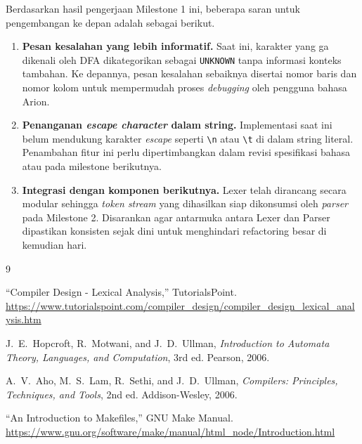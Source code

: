 \documentclass[11pt,a4paper]{article}
\begin{document}
Berdasarkan hasil pengerjaan Milestone 1 ini, beberapa saran untuk pengembangan ke depan adalah sebagai berikut.

\begin{enumerate}
    \item \textbf{Pesan kesalahan yang lebih informatif.}
          Saat ini, karakter yang ga dikenali oleh DFA dikategorikan sebagai \texttt{UNKNOWN} tanpa informasi konteks tambahan.
          Ke depannya, pesan kesalahan sebaiknya disertai nomor baris dan nomor kolom untuk mempermudah proses \textit{debugging} oleh pengguna bahasa Arion.
    \item \textbf{Penanganan \textit{escape character} dalam string.}
          Implementasi saat ini belum mendukung karakter \textit{escape} seperti \texttt{\textbackslash n} atau \texttt{\textbackslash t} di dalam string literal.
          Penambahan fitur ini perlu dipertimbangkan dalam revisi spesifikasi bahasa atau pada milestone berikutnya.
    \item \textbf{Integrasi dengan komponen berikutnya.}
          Lexer telah dirancang secara modular sehingga \textit{token stream} yang dihasilkan siap dikonsumsi oleh \textit{parser} pada Milestone 2.
          Disarankan agar antarmuka antara Lexer dan Parser dipastikan konsisten sejak dini untuk menghindari refactoring besar di kemudian hari.
\end{enumerate}

\begin{thebibliography}{9}

``Compiler Design - Lexical Analysis,''
TutorialsPoint.
\url{https://www.tutorialspoint.com/compiler_design/compiler_design_lexical_analysis.htm}

J.~E.~Hopcroft, R.~Motwani, and J.~D.~Ullman,
\textit{Introduction to Automata Theory, Languages, and Computation}, 3rd ed.
Pearson, 2006.

A.~V.~Aho, M.~S.~Lam, R.~Sethi, and J.~D.~Ullman,
\textit{Compilers: Principles, Techniques, and Tools}, 2nd ed.
Addison-Wesley, 2006.

``An Introduction to Makefiles,''
GNU Make Manual.
\url{https://www.gnu.org/software/make/manual/html_node/Introduction.html}

\end{thebibliography}

\newpage
\end{document}
